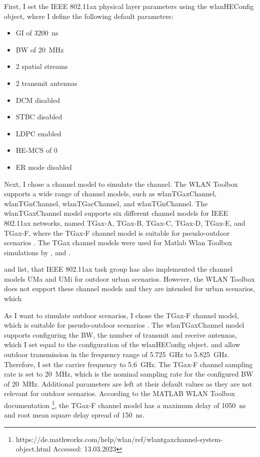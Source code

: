 First, I set the IEEE 802.11ax physical layer parameters using the wlanHEConfig object, where I define the following default parameters:
\begin{itemize}
	\item \ac{GI} of \SI{3200}{\nano\second}
	\item \ac{BW} of \SI{20}{\mega\hertz}
	\item 2 spatial streams
	\item 2 transmit antennas
	\item \ac{DCM} disabled
	\item \ac{STBC} disabled
	\item \ac{LDPC} enabled
	\item HE-\ac{MCS} of 0
	\item \ac{ER} mode disabled
\end{itemize}
Next, I chose a channel model to simulate the channel. The WLAN Toolbox supports a wide range of channel models, such as wlanTGaxChannel, wlanTGnChannel, wlanTGacChannel, and wlanTGnChannel.
The wlanTGaxChannel model supports six different channel models for IEEE 802.11ax networks, named TGax-A, TGax-B, TGax-C, TGax-D, TGax-E, and TGax-F,
where the TGax-F channel model is suitable for pseudo-outdoor scenarios \cite{TGAXCHANNEL}.
The TGax channel models were used for Matlab Wlan Toolbox simulations by \cite{s_performance_2022}, \cite{cao_efficient_2022} and \cite{jin_efficient_2021}.

\cite{TGAXCHANNEL} and \cite{omar_survey_2016} list, that IEEE 802.11ax task group has also implemented the channel models UMa and UMi for
outdoor urban scenarios. However, the WLAN Toolbox does not support these channel models and they are intended for urban scenarios, which

As I want to simulate outdoor scenarios, I chose the TGax-F channel model, which is suitable for pseudo-outdoor scenarios \cite{TGAXCHANNEL}.
The wlanTGaxChannel model supports configuring the \ac{BW}, the number of transmit and receive antennas, which I set equal to the configuration of the wlanHEConfig object.
\cite{freq_plan_24G} and \cite{freq_plan_5G} allow outdoor transmission in the frequency range of \SI{5.725}{\giga\hertz} to \SI{5.825}{\giga\hertz}. Therefore, I set the carrier frequency to \SI{5.6}{\giga\hertz}.
The TGax-F channel sampling rate is set to \SI{20}{\mega\hertz}, which is the nominal sampling rate for the configured \ac{BW} of \SI{20}{\mega\hertz}.
Additional parameters are left at their default values as they are not relevant for outdoor scenarios. According to the MATLAB WLAN Toolbox documentation \footnote{https://de.mathworks.com/help/wlan/ref/wlantgaxchannel-system-object.html Accessed: 13.03.2023},
the TGax-F channel model has a maximum delay of \SI{1050}{\nano\second} and root mean square delay spread of \SI{150}{\nano\second}.

